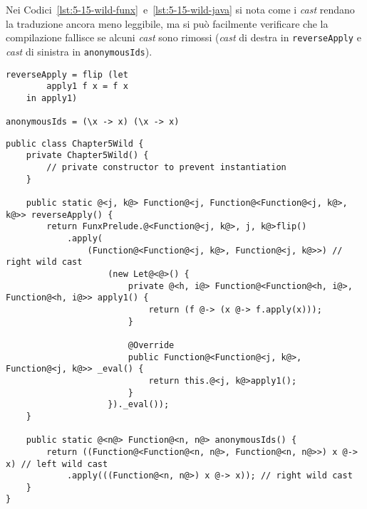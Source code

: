 \newpage

Nei Codici~\ref{lst:5-15-wild-funx}~e~\ref{lst:5-15-wild-java} si nota come i \textit{cast} rendano la traduzione ancora meno
leggibile, ma si può facilmente verificare che la compilazione fallisce se alcuni \textit{cast} sono rimossi
(\textit{cast} di destra in \texttt{reverseApply} e \textit{cast} di sinistra in \texttt{anonymousIds}).

\vspace{4mm}
\begin{lstlisting}[caption={Applicazione tra funzioni, espressioni \texttt{let} e \texttt{lambda}}, style=funxCode, label={lst:5-15-wild-funx}]
reverseApply = flip (let
        apply1 f x = f x
    in apply1)

anonymousIds = (\x -> x) (\x -> x)
\end{lstlisting}
\vspace{4mm}
\begin{lstlisting}[caption={Traduzione in \texttt{Java} con \textit{cast} "selvaggi"}, style=javaCode, label={lst:5-15-wild-java}]
public class Chapter5Wild {
    private Chapter5Wild() {
        // private constructor to prevent instantiation
    }
    
    public static @<j, k@> Function@<j, Function@<Function@<j, k@>, k@>> reverseApply() {
        return FunxPrelude.@<Function@<j, k@>, j, k@>flip()
            .apply(
                (Function@<Function@<j, k@>, Function@<j, k@>>) // right wild cast
                    (new Let@<@>() {
                        private @<h, i@> Function@<Function@<h, i@>, Function@<h, i@>> apply1() {
                            return (f @-> (x @-> f.apply(x)));
                        }
    
                        @Override
                        public Function@<Function@<j, k@>, Function@<j, k@>> _eval() {
                            return this.@<j, k@>apply1();
                        }
                    })._eval());
    }
    
    public static @<n@> Function@<n, n@> anonymousIds() {
        return ((Function@<Function@<n, n@>, Function@<n, n@>>) x @-> x) // left wild cast
            .apply(((Function@<n, n@>) x @-> x)); // right wild cast
    }
}
\end{lstlisting}
